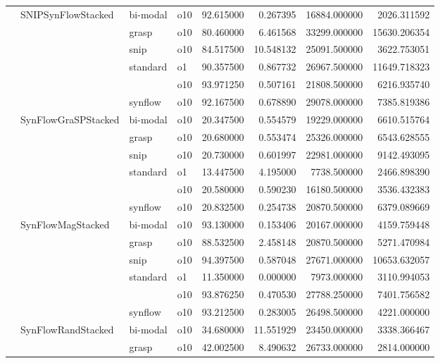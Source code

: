 \begin{longtable}{llllrrrr}
      & SNIPSynFlowStacked & bi-modal & o10 &  92.615000 &   0.267395 &     16884.000000 &   2026.311592 \\
      &     & grasp & o10 &  80.460000 &   6.461568 &     33299.000000 &  15630.206354 \\
      &     & snip & o10 &  84.517500 &  10.548132 &     25091.500000 &   3622.753051 \\
      &     & standard & o1 &  90.357500 &   0.867732 &     26967.500000 &  11649.718323 \\
      &     &         & o10 &  93.971250 &   0.507161 &     21808.500000 &   6216.935740 \\
      &     & synflow & o10 &  92.167500 &   0.678890 &     29078.000000 &   7385.819386 \\
      & SynFlowGraSPStacked & bi-modal & o10 &  20.347500 &   0.554579 &     19229.000000 &   6610.515764 \\
      &     & grasp & o10 &  20.680000 &   0.553474 &     25326.000000 &   6543.628555 \\
      &     & snip & o10 &  20.730000 &   0.601997 &     22981.000000 &   9142.493095 \\
      &     & standard & o1 &  13.447500 &   4.195000 &      7738.500000 &   2466.898390 \\
      &     &         & o10 &  20.580000 &   0.590230 &     16180.500000 &   3536.432383 \\
      &     & synflow & o10 &  20.832500 &   0.254738 &     20870.500000 &   6379.089669 \\
      & SynFlowMagStacked & bi-modal & o10 &  93.130000 &   0.153406 &     20167.000000 &   4159.759448 \\
      &     & grasp & o10 &  88.532500 &   2.458148 &     20870.500000 &   5271.470984 \\
      &     & snip & o10 &  94.397500 &   0.587048 &     27671.000000 &  10653.632057 \\
      &     & standard & o1 &  11.350000 &   0.000000 &      7973.000000 &   3110.994053 \\
      &     &         & o10 &  93.876250 &   0.470530 &     27788.250000 &   7401.756582 \\
      &     & synflow & o10 &  93.212500 &   0.283005 &     26498.500000 &   4221.000000 \\
      & SynFlowRandStacked & bi-modal & o10 &  34.680000 &  11.551929 &     23450.000000 &   3338.366467 \\
      &     & grasp & o10 &  42.002500 &   8.490632 &     26733.000000 &   2814.000000 \\

\end{longtable}
